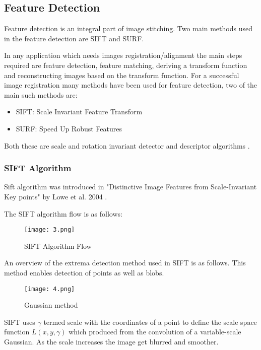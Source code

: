 \subsection{Feature Detection}
\label{lit_sub_sec:1_1}
Feature detection is an integral part of image stitching. Two main methods used in the feature detection are SIFT and SURF.

In any application which needs images registration/alignment the main steps required are feature detection, feature matching, deriving a transform function and reconstructing images based on the transform function. For a successful image registration many methods have been used for feature detection, two of the main such methods are:
\begin{itemize}
\item SIFT: Scale Invariant Feature Transform
\item SURF: Speed Up Robust Features
\end{itemize}

Both these are scale and rotation invariant detector and descriptor algorithms \cite{panchal2013}.

\subsubsection{SIFT Algorithm}
Sift algorithm was introduced in "Distinctive Image Features from Scale-Invariant Key points" by Lowe et al. 2004 \cite{Lowe2004}.

The SIFT algorithm flow is as follows:

\begin{figure}[htbp]
\sidecaption
\texttt{[image: 3.png]}
\caption{SIFT Algorithm Flow}
\label{Fig_2_SIFT_flow}       %
\end{figure}

An overview of the extrema detection method used in SIFT is as follows. This method enables detection of points as well as blobs.

\begin{figure}[htbp]
\sidecaption
\texttt{[image: 4.png]}
\caption{Gaussian method}
\label{Fig_2_Gaussian_method}       %
\end{figure}

SIFT uses $\gamma$ termed scale with the coordinates of a point to define the scale space function $L(x, y, \gamma)$ which produced from the convolution of a variable-scale Gaussian. As the scale increases the image get blurred and smoother.

